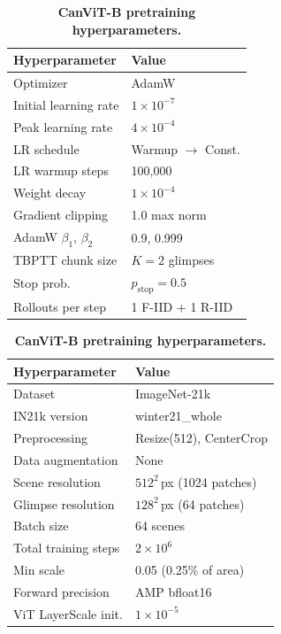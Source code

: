 \documentclass{article}
\begin{document}
\begin{table}[h]
  \caption{\textbf{CanViT-B pretraining hyperparameters.}}
  \label{tab:pretrain-hparams}
  \centering
  \begin{minipage}[t]{0.49\linewidth}
    \centering
    \setlength{\tabcolsep}{3.4pt}%
    \begin{tabular}{ll}
      \toprule
      \textbf{Hyperparameter} & \textbf{Value} \\
      \midrule
      Optimizer & AdamW \\
      Initial learning rate & $1 \times 10^{-7}$ \\
      Peak learning rate & $4 \times 10^{-4}$ \\
      LR schedule & Warmup $\to$ Const. \\
      LR warmup steps & 100{,}000 \\
      Weight decay & $1 \times 10^{-4}$ \\
      Gradient clipping & 1.0 max norm \\
      AdamW $\beta_1$, $\beta_2$ & 0.9, 0.999 \\
      TBPTT chunk size & $K = 2$ glimpses \\
      Stop prob. & $p_{\mathrm{stop}} = 0.5$ \\
      Rollouts per step & 1 F-IID + 1 R-IID \\
      \bottomrule
    \end{tabular}
  \end{minipage}
  \hfill
  \begin{minipage}[t]{0.49\linewidth}
    \centering
    \setlength{\tabcolsep}{3.4pt}%
    \begin{tabular}{ll}
      \toprule
      \textbf{Hyperparameter} & \textbf{Value} \\
      \midrule
      Dataset & ImageNet-21k \\
      IN21k version & winter21\_whole \\
      Preprocessing & Resize(512), CenterCrop \\
      Data augmentation & None \\
      Scene resolution & $512^2$\,px (1024 patches) \\
      Glimpse resolution & $128^2$\,px (64 patches) \\
      Batch size & 64 scenes \\
      Total training steps & $2 \times 10^6$ \\
      Min scale & 0.05 (0.25\% of area) \\
      Forward precision & AMP bfloat16 \\
      ViT LayerScale init. & $1 \times 10^{-5}$ \\
      \bottomrule
    \end{tabular}
  \end{minipage}
\end{table}
\end{document}
